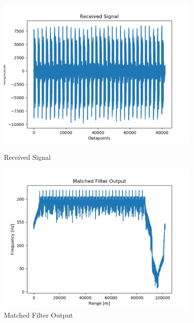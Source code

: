 \begin{figure}[h!]
    \centering
    \begin{minipage}{0.45\textwidth}
        \centering
        \includegraphics[width=0.9\textwidth]{images/rxSig.pdf}
        \caption{Received Signal}\label{fig:rxSignal101}
    \end{minipage}\hfill
    \begin{minipage}{0.45\textwidth}
        \centering
        \includegraphics[width = 0.9\textwidth]{images/mf.pdf}
        \caption{Matched Filter Output}\label{fig:matchedfilterOutput}
    \end{minipage}
\end{figure}

